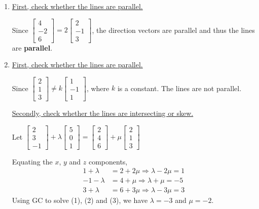 \documentclass[11pt,a4paper]{book}
\begin{document}
\begin{example}
\begin{enumerate}[label=(\alph*)]
\end{enumerate}

\Solution

\begin{enumerate}[label=(\alph*)]

\item  \uline{First, check whether the lines are parallel.}

Since $\begin{bmatrix}4\\
-2\\
6
\end{bmatrix}=2\begin{bmatrix}2\\
-1\\
3
\end{bmatrix}$, the direction vectors are parallel and thus the lines are \textbf{parallel}.

\item  \uline{First, check whether the lines are parallel.}

Since $\begin{bmatrix}2\\
1\\
3
\end{bmatrix}\neq k\begin{bmatrix}1\\
-1\\
1
\end{bmatrix}$, where $k$ is a constant. The lines are not parallel.

\uline{Secondly, check whether the lines are intersecting or skew.}

Let $\begin{bmatrix}2\\
3\\
-1
\end{bmatrix}+\lambda\begin{bmatrix}5\\
0\\
1
\end{bmatrix}=\begin{bmatrix}2\\
4\\
6
\end{bmatrix}+\mu\begin{bmatrix}2\\
1\\
3
\end{bmatrix}$

Equating the $x$, $y$ and $z$ components,
\begin{align*}
1+\lambda & =2+2\mu\Rightarrow\lambda-2\mu=1\tag{1}\\
-1-\lambda & =4+\mu\Rightarrow\lambda+\mu=-5\tag{2}\\
3+\lambda & =6+3\mu\Rightarrow\lambda-3\mu=3\tag{3}
\end{align*}
Using GC to solve (1), (2) and (3), we have $\lambda=-3$ and $\mu=-2$.


\end{enumerate}
\end{example}
\end{document}
